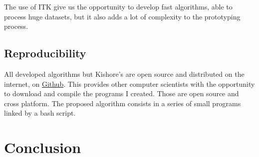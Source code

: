 The use of ITK give us the opportunity to develop fast algorithms, able to process huge datasets, but it also adds a lot of complexity to the prototyping process.


\subsection{Reproducibility}

All developed algorithms but Kishore's are open source and distributed on the internet, on \href{http://github.com/antonin07130}{Github}.
This provides other computer scientists with the opportunity to download and compile the programs I created.
Those are open source and cross platform. The proposed algorithm consists in a series of small programs linked by a bash script.



\section{Conclusion}

